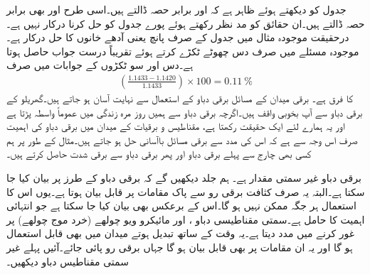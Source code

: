 جدول کو دیکھتے ہوئے ظاہر ہے کہ  اور  برابر حصہ ڈالتے ہیں۔اسی طرح  اور  بھی برابر حصہ ڈالتے ہیں۔ان حقائق کو مد نظر رکھتے ہوئے پورے جدول کو حل کرنا درکار نہیں ہے۔درحقیقت موجودہ مثال میں جدول کے صرف پانچ یعنی آدھے خانوں  کا حل درکار ہے۔موجودہ مسئلے میں صرف دس چھوٹے ٹکڑے کرتے ہوئے تقریباً درست جواب حاصل ہوتا ہے۔دس اور سو ٹکڑوں کے جوابات میں صرف
\begin{align*}
\left(\frac{1.1433-1.1420}{1.1433}\right)\times 100=\SI{0.11}{\percent} 
\end{align*}
کا فرق ہے۔
برقی میدان کے مسائل برقی دباو کے استعمال سے نہایت آسان ہو جاتے ہیں۔گھریلو  کے برقی دباو سے آپ بخوبی واقف ہیں۔اگرچہ برقی دباو سے ہمیں روز مرہ زندگی میں عموماً واسطہ پڑتا ہے اور یہ ہمارے لئے ایک حقیقت رکھتا ہے، مقناطیس و برقیات کے میدان میں برقی دباو کی اہمیت صرف اس وجہ سے ہے کہ اس کی مدد سے برقی مسائل باآسانی حل ہو جاتے ہیں۔مثال کے طور پر ہم کسی بھی چارج سے پہلے برقی دباو اور پھر برقی دباو سے برقی شدت حاصل کرتے ہیں۔

برقی دباو غیر سمتی مقدار ہے۔ ہم جلد دیکھیں گے کہ برقی دباو کے طرز پر  بیان کیا جا سکتا ہے۔البتہ یہ صرف کثافت برقی رو سے پاک مقامات پر قابل بیان ہوتا ہے۔یوں اس کا استعمال ہر جگہ ممکن نہیں ہو گا۔اس کے برعکس  بھی بیان کیا جا سکتا ہے جو انتہائی اہمیت کا حامل ہے۔سمتی مقناطیسی دباو ،  اور مائیکرو ویو چولھے (خرد موج چولھے) پر غور کرنے میں مدد دیتا ہے۔یہ وقت کے ساتھ تبدیل ہوتے میدان میں بھی قابل استعمال ہو گا اور یہ ان مقامات پر بھی قابل بیان ہو گا جہاں برقی رو پائی جائے۔آئیں پہلے غیر سمتی مقناطیس دباو دیکھیں۔

